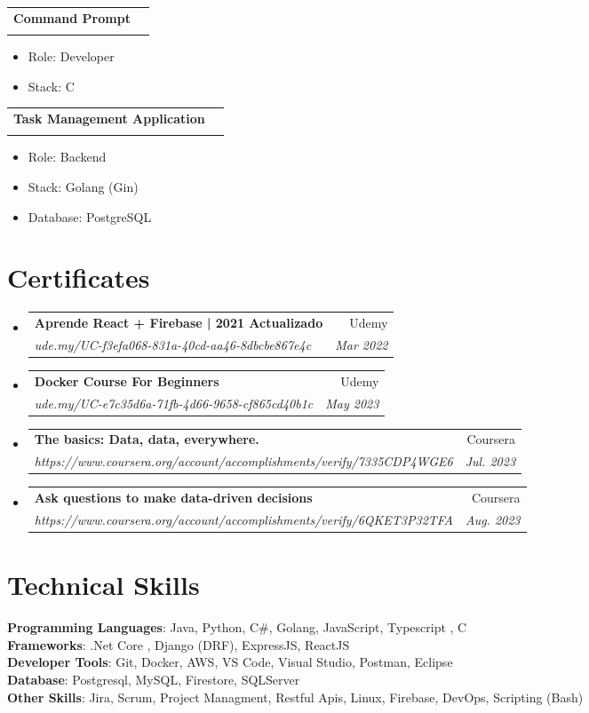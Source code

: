 \documentclass[letterpaper,11pt]{article}
\makeatletter
\newcommand{\resumeItem}[1]{
  \item\small{
    {#1 \vspace{-2pt}}
  }
}
\newcommand{\resumeSubheading}[4]{
  \vspace{-2pt}\item
    \begin{tabular*}{0.97\textwidth}[t]{l@{\extracolsep{\fill}}r}
      \textbf{#1} & #2 \\
      \textit{\small#3} & \textit{\small #4} \\
    \end{tabular*}\vspace{-7pt}
}
\newcommand{\resumeSubHeadingListStart}{\begin{itemize}[leftmargin=0.15in, label={}]}
\newcommand{\resumeSubHeadingListEnd}{\end{itemize}}
\newcommand{\resumeItemListStart}{\begin{itemize}}
\newcommand{\resumeItemListEnd}{\end{itemize}\vspace{-5pt}}
\makeatother
\begin{document}
\resumeSubheading
    {Command Prompt}{}
    {}{}
\resumeItemListStart
    \resumeItem{Role: Developer}
    \resumeItem{Stack: C}
\resumeItemListEnd

\resumeSubheading
    {Task Management Application}{}
    {}{}
\resumeItemListStart
    \resumeItem{Role: Backend}
    \resumeItem{Stack: Golang (Gin)}
    \resumeItem{Database: PostgreSQL}
\resumeItemListEnd



\section{Certificates}



  \resumeSubHeadingListStart
    \resumeSubheading
      {Aprende React + Firebase | 2021 Actualizado
}{Udemy}
      {ude.my/UC-f3efa068-831a-40cd-aa46-8dbcbe867e4c}{Mar 2022}
  \resumeSubHeadingListEnd

  \resumeSubHeadingListStart
    \resumeSubheading
      {Docker Course For Beginners}{Udemy}
      {ude.my/UC-e7c35d6a-71fb-4d66-9658-cf865cd40b1c}{May 2023}
  \resumeSubHeadingListEnd

  \resumeSubHeadingListStart
    \resumeSubheading
      {The basics: Data, data, everywhere.}{Coursera}
      {https://www.coursera.org/account/accomplishments/verify/7335CDP4WGE6}{Jul. 2023}
  \resumeSubHeadingListEnd

  \resumeSubHeadingListStart
    \resumeSubheading
      {Ask questions to make data-driven decisions}{Coursera}
      {https://www.coursera.org/account/accomplishments/verify/6QKET3P32TFA}{Aug. 2023}
  \resumeSubHeadingListEnd


%

\section{Technical Skills}
 \begin{itemize}[leftmargin=0.15in, label={}]
    \small{\item{
     \textbf{Programming Languages}{: Java, Python, C\#, Golang, JavaScript, Typescript , C } \\
     \textbf{Frameworks}{: .Net Core , Django (DRF), ExpressJS, ReactJS} \\
     \textbf{Developer Tools}{: Git, Docker, AWS, VS Code, Visual Studio, Postman, Eclipse} \\
     \textbf{Database}{: Postgresql, MySQL, Firestore, SQLServer} \\
     \textbf{Other Skills}{: Jira, Scrum, Project Managment, Restful Apis, Linux, Firebase, DevOps, Scripting (Bash)}
    }}
 \end{itemize}
\end{document}
